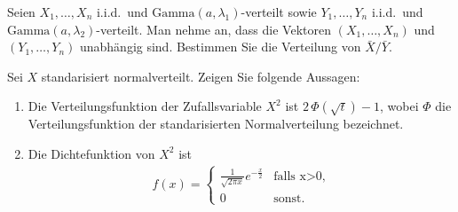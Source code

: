 Seien $X_1,\ldots,X_n$ i.i.d.\ und $\textrm{Gamma}(a, \lambda_1)$-verteilt sowie
$Y_1,\ldots,Y_n$ i.i.d.\ und $\textrm{Gamma}(a,\lambda_2)$-verteilt. Man nehme an,
dass die Vektoren $(X_1,\ldots,X_n)$ und $(Y_1,\ldots,Y_n)$ unabhängig sind. 
Bestimmen Sie die Verteilung von $\bar X/\bar Y$.

 Sei $X$ 
standarisiert normalverteilt. Zeigen Sie folgende Aussagen:
\begin{enumerate}
    \item Die Verteilungsfunktion der Zufallsvariable $X^2$ ist $2\, \Phi(\sqrt{t})-1$,
        wobei $\Phi$ die Verteilungsfunktion der standarisierten Normalverteilung 
        bezeichnet.
    \item Die Dichtefunktion von $X^2$ ist 
        \begin{align*}
            f(x) = \begin{cases}
                \frac{1}{\sqrt{2 \pi x}} e^{-\frac{x}{2}} & \text{falls x>0}, \\
                0 & \text{sonst.}
            \end{cases}
        \end{align*}
\end{enumerate}

